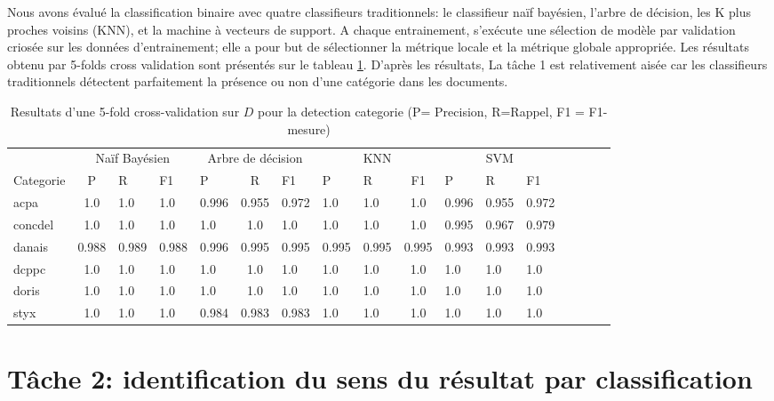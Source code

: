 Nous avons évalué la classification binaire avec quatre classifieurs traditionnels: le classifieur naïf bayésien, l'arbre de décision, les K plus proches voisins (KNN), et la machine à vecteurs de support. A chaque entrainement, s'exécute une sélection de modèle par validation criosée sur les données d'entrainement; elle a pour but de sélectionner la métrique locale et la métrique globale appropriée. Les résultats obtenu par 5-folds cross validation sont présentés sur le tableau \ref{tab:quanta:resultat-detect-cat}.  D'après les résultats, La tâche 1 est relativement aisée car les classifieurs traditionnels détectent parfaitement la présence ou non d'une catégorie dans les documents.

\begin{table}
\scriptsize
\centering
\begin{tabular}{l|c@{\hskip 0.1in}lllc@{\hskip 0.1in}lllc@{\hskip 0.1in}lllc@{\hskip 0.1in}lll}
\hline\noalign{\smallskip}
       &   \multicolumn{3}{c}{Naïf Bayésien}    &    \multicolumn{3}{c}{Arbre de décision}   &  \multicolumn{3}{c}{KNN}  & \multicolumn{3}{c}{SVM}     \\       
\noalign{\smallskip}
\hline
\noalign{\smallskip}
  Categorie  & P     & R     & F1    & P     & R     & F1    & P     & R     & F1    & P     & R     & F1    \\        
\noalign{\smallskip}
\hline
\noalign{\smallskip}
acpa    & 1.0 & 1.0 & 1.0 & 0.996 & 0.955 & 0.972 & 1.0 & 1.0 & 1.0 & 0.996 & 0.955 & 0.972 \\
concdel & 1.0 & 1.0 & 1.0 & 1.0 & 1.0 & 1.0 & 1.0 & 1.0 & 1.0 & 0.995 & 0.967 & 0.979 \\
danais  & 0.988 & 0.989 & 0.988 & 0.996 & 0.995 & 0.995 & 0.995 & 0.995 & 0.995 & 0.993 & 0.993 & 0.993 \\
dcppc   & 1.0 & 1.0 & 1.0 & 1.0 & 1.0 & 1.0 & 1.0 & 1.0 & 1.0 & 1.0 & 1.0 & 1.0 \\
doris   & 1.0 & 1.0 & 1.0 & 1.0 & 1.0 & 1.0 & 1.0 & 1.0 & 1.0 & 1.0 & 1.0 & 1.0 \\
styx    & 1.0 & 1.0 & 1.0 & 0.984 & 0.983 & 0.983 & 1.0 & 1.0 & 1.0 & 1.0 & 1.0 & 1.0 \\
\hline
\end{tabular}
\caption{Resultats d'une 5-fold cross-validation sur $D$ pour la detection categorie  (P= Precision, R=Rappel, F1 = F1-mesure)}\label{tab:quanta:resultat-detect-cat}
\end{table}


\section{Tâche 2: identification du sens du résultat par classification}

